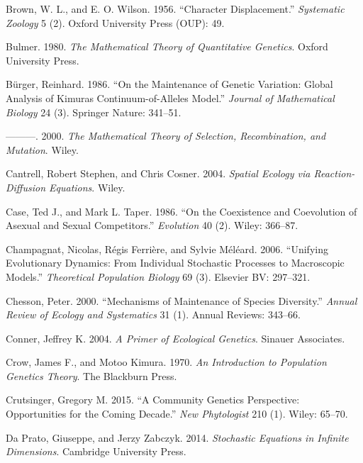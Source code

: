 \documentclass[]{article}
\begin{document}
\leavevmode\hypertarget{ref-Brown1956}{}%
Brown, W. L., and E. O. Wilson. 1956. ``Character Displacement.''
\emph{Systematic Zoology} 5 (2). Oxford University Press (OUP): 49.

\leavevmode\hypertarget{ref-bulmer1980}{}%
Bulmer. 1980. \emph{The Mathematical Theory of Quantitative Genetics}.
Oxford University Press.

\leavevmode\hypertarget{ref-Brger1986}{}%
Bürger, Reinhard. 1986. ``On the Maintenance of Genetic Variation:
Global Analysis of Kimuras Continuum-of-Alleles Model.'' \emph{Journal
of Mathematical Biology} 24 (3). Springer Nature: 341--51.

\leavevmode\hypertarget{ref-9780471986539}{}%
---------. 2000. \emph{The Mathematical Theory of Selection,
Recombination, and Mutation}. Wiley.

\leavevmode\hypertarget{ref-Cantrell2004}{}%
Cantrell, Robert Stephen, and Chris Cosner. 2004. \emph{Spatial Ecology
via Reaction-Diffusion Equations}. Wiley.

\leavevmode\hypertarget{ref-Case1986}{}%
Case, Ted J., and Mark L. Taper. 1986. ``On the Coexistence and
Coevolution of Asexual and Sexual Competitors.'' \emph{Evolution} 40
(2). Wiley: 366--87.

\leavevmode\hypertarget{ref-Champagnat2006}{}%
Champagnat, Nicolas, Régis Ferrière, and Sylvie Méléard. 2006.
``Unifying Evolutionary Dynamics: From Individual Stochastic Processes
to Macroscopic Models.'' \emph{Theoretical Population Biology} 69 (3).
Elsevier BV: 297--321.

\leavevmode\hypertarget{ref-Chesson2000}{}%
Chesson, Peter. 2000. ``Mechanisms of Maintenance of Species
Diversity.'' \emph{Annual Review of Ecology and Systematics} 31 (1).
Annual Reviews: 343--66.

\leavevmode\hypertarget{ref-jeffreyconner2004}{}%
Conner, Jeffrey K. 2004. \emph{A Primer of Ecological Genetics}. Sinauer
Associates.

\leavevmode\hypertarget{ref-9781932846126}{}%
Crow, James F., and Motoo Kimura. 1970. \emph{An Introduction to
Population Genetics Theory}. The Blackburn Press.

\leavevmode\hypertarget{ref-Crutsinger2015}{}%
Crutsinger, Gregory M. 2015. ``A Community Genetics Perspective:
Opportunities for the Coming Decade.'' \emph{New Phytologist} 210 (1).
Wiley: 65--70.

\leavevmode\hypertarget{ref-DaPrato2014}{}%
Da Prato, Giuseppe, and Jerzy Zabczyk. 2014. \emph{Stochastic Equations
in Infinite Dimensions}. Cambridge University Press.
\end{document}
